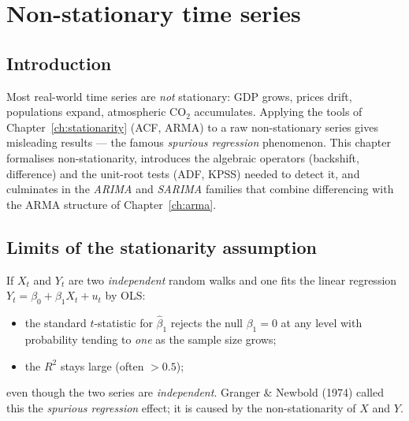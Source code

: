 
\chapter{Non-stationary time series}
\label{ch:nonstationarity}

\section*{Introduction}

Most real-world time series are \emph{not} stationary: GDP grows,
prices drift, populations expand, atmospheric CO$_2$ accumulates.
Applying the tools of Chapter~\ref{ch:stationarity} (ACF, ARMA) to a
raw non-stationary series gives misleading results — the famous
\emph{spurious regression} phenomenon. This chapter formalises
non-stationarity, introduces the algebraic operators (backshift,
difference) and the unit-root tests (ADF, KPSS) needed to detect it,
and culminates in the \emph{ARIMA} and \emph{SARIMA} families that
combine differencing with the ARMA structure of
Chapter~\ref{ch:arma}.

\section{Limits of the stationarity assumption}
\label{sec:non-stat-limits}

\begin{warnbox}
\label{warn:spurious}
If $X_t$ and $Y_t$ are two \emph{independent} random walks and one
fits the linear regression $Y_t = \beta_0 + \beta_1 X_t + u_t$ by
OLS:
\begin{itemize}
  \item the standard $t$-statistic for $\widehat\beta_1$ rejects the
        null $\beta_1 = 0$ at any level with probability tending to
        \emph{one} as the sample size grows;
  \item the $R^2$ stays large (often $> 0.5$);
\end{itemize}
even though the two series are \emph{independent}. Granger \& Newbold
(1974) called this the \emph{spurious regression} effect; it is
caused by the non-stationarity of $X$ and $Y$.
\end{warnbox}

